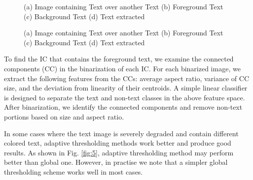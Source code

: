 \begin{figure}[p]
\centering
{}
\caption
{(a) Image containing Text over another Text (b) Foreground Text (c) Background Text (d)
Text extracted}
\caption
{(a) Image containing Text over another Text (b) Foreground Text (c) Background Text (d)
Text extracted}
\end{figure}











To find the IC that contains the foreground text, we examine the connected components (CC) in the 
binarization of each IC. For each binarized image, we extract the following features from the CCs: 
average aspect ratio, variance of  CC size, and the deviation from linearity of their centroids.
A simple linear classifier is designed to separate the text and non-text classes in the above feature space.
After binarization, we identify the
connected components and remove non-text portions based on size and aspect ratio.

In some cases where the text image is severely degraded and contain different colored text,
adaptive thresholding methods work better and produce good results. As shown in Fig. \ref{fig:5}, adaptive thresholding
method may perform better than global one. However, in practise we note that a simpler global thresholding
scheme works well in most cases.



